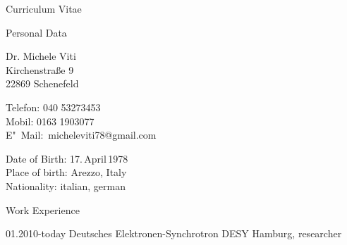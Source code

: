 \documentclass[11pt,a4paper]{scrartcl}
\begin{document}
\begin{cv}{Curriculum Vitae}
\begin{cvlist}{Personal Data}
\item Dr. Michele Viti\\
Kirchenstra{\ss}e 9\\
22869 Schenefeld
\item Telefon: 040 53273453\\
Mobil: 0163 1903077\\
E"~Mail:~micheleviti78@gmail.com
\item Date of Birth: 17.\,April\,1978\\
Place of birth: Arezzo, Italy\\
Nationality: italian, german
\end{cvlist}

\begin{cvlist}{Work Experience}

\item[01.2010-today] Deutsches Elektronen-Synchrotron DESY Hamburg, researcher


\end{cvlist}
\end{cv}
\end{document}
